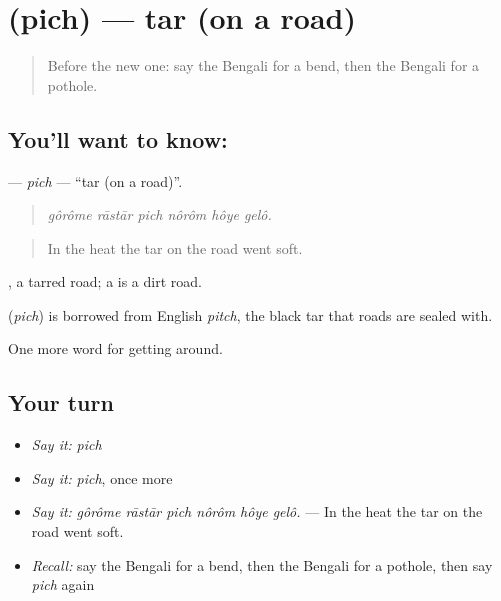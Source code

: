 \section[\texorpdfstring{\bn{পিচ} (pich)}{পিচ (pich)}]{ (pich) — tar (on a road)}

\label{lesson:BN-C390-pich}



\begin{quote}
Before the new one: say the Bengali for a bend, then the Bengali for a pothole.
\end{quote}

\subsection*{You'll want to know: }
\textbf{} — \emph{pich} — \textquotedblleft{}tar (on a road)\textquotedblright{}.

\begin{quote}
     
\end{quote}

\begin{quote}
\emph{gôrôme rāstār pich nôrôm hôye gelô.}
\end{quote}

\begin{quote}
In the heat the tar on the road went soft.
\end{quote}

 , a tarred road; a   is a dirt road.

\begin{cousinweb}
\textbf{} (\emph{pich}) is borrowed from English \emph{pitch}, the black tar that roads are sealed with.
\end{cousinweb}

\begin{grammarlens}[title={What you've built}]
One more word for getting around.
\end{grammarlens}

\subsection*{Your turn}
\begin{itemize}
\raggedright
  \item \emph{Say it:} \emph{pich}
  \item \emph{Say it:} \emph{pich}, once more
  \item \emph{Say it:} \emph{gôrôme rāstār pich nôrôm hôye gelô.} — In the heat the tar on the road went soft.
  \item \emph{Recall:} say the Bengali for a bend, then the Bengali for a pothole, then say \emph{pich} again
\end{itemize}


